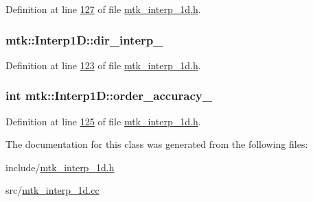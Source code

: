 Definition at line \hyperlink{mtk__interp__1d_8h_source_l00127}{127} of file \hyperlink{mtk__interp__1d_8h_source}{mtk\+\_\+interp\+\_\+1d.\+h}.

\hypertarget{classmtk_1_1Interp1D_a854e2c72f07c9fca4bbe32bfad2e0792}{
\subsubsection[{dir\+\_\+interp\+\_\+}]{ mtk\+::\+Interp1\+D\+::dir\+\_\+interp\+\_\+\hspace{0.3cm}{\ttfamily [private]}}}\label{classmtk_1_1Interp1D_a854e2c72f07c9fca4bbe32bfad2e0792}


Definition at line \hyperlink{mtk__interp__1d_8h_source_l00123}{123} of file \hyperlink{mtk__interp__1d_8h_source}{mtk\+\_\+interp\+\_\+1d.\+h}.

\hypertarget{classmtk_1_1Interp1D_a1ee8467d93536dc04240cd76f0d95c9c}{
\subsubsection[{order\+\_\+accuracy\+\_\+}]{\setlength{\rightskip}{0pt plus 5cm}int mtk\+::\+Interp1\+D\+::order\+\_\+accuracy\+\_\+\hspace{0.3cm}{\ttfamily [private]}}}\label{classmtk_1_1Interp1D_a1ee8467d93536dc04240cd76f0d95c9c}


Definition at line \hyperlink{mtk__interp__1d_8h_source_l00125}{125} of file \hyperlink{mtk__interp__1d_8h_source}{mtk\+\_\+interp\+\_\+1d.\+h}.



The documentation for this class was generated from the following files\+:\begin{DoxyCompactItemize}
\item 
include/\hyperlink{mtk__interp__1d_8h}{mtk\+\_\+interp\+\_\+1d.\+h}\item 
src/\hyperlink{mtk__interp__1d_8cc}{mtk\+\_\+interp\+\_\+1d.\+cc}\end{DoxyCompactItemize}

